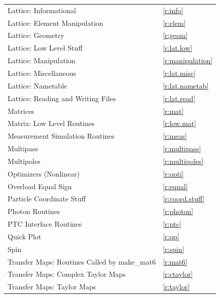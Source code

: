 \begin{center}
\begin{tabular}{ll}
  Lattice: Informational                      & \ref{r:info}           \\
  Lattice: Element Manipulation               & \ref{r:elem}           \\
  Lattice: Geometry                           & \ref{r:geom}           \\
  Lattice: Low Level Stuff                    & \ref{r:lat.low}        \\
  Lattice: Manipulation                       & \ref{r:manipulation}          \\
  Lattice: Miscellaneous                      & \ref{r:lat.misc}       \\
  Lattice: Nametable                          & \ref{r:lat.nametab}    \\
  Lattice: Reading and Writing Files          & \ref{r:lat.read}       \\
  Matrices                                    & \ref{r:mat}            \\
  Matrix: Low Level Routines                  & \ref{r:low.mat}        \\
  Measurement Simulation Routines             & \ref{r:meas}           \\
  Multipass                                   & \ref{r:multipass}      \\
  Multipoles                                  & \ref{r:multipoles}     \\
  Optimizers (Nonlinear)                      & \ref{r:opti}           \\
  Overload Equal Sign                         & \ref{r:equal}          \\
  Particle Coordinate Stuff                   & \ref{r:coord.stuff}    \\
  Photon Routines                             & \ref{r:photon}         \\
  PTC Interface Routines                      & \ref{r:ptc}            \\
  Quick Plot                                  & \ref{r:qp}             \\
  Spin                                        & \ref{r:spin}           \\
  Transfer Maps: Routines Called by make_mat6 & \ref{r:mat6}           \\
  Transfer Maps: Complex Taylor Maps          & \ref{r:ctaylor}        \\
  Transfer Maps: Taylor Maps                  & \ref{r:taylor}         \\

\end{tabular}
\end{center}
